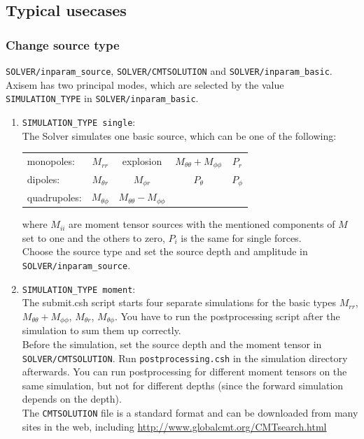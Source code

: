 \documentclass[11pt,letter,fleqn,english,notitlepage]{article}
\begin{document}
\subsection{Typical usecases}
\subsubsection{Change source type}
\verb|SOLVER/inparam_source|, \verb|SOLVER/CMTSOLUTION| and \verb|SOLVER/inparam_basic|.
Axisem has two principal modes, which are selected by the value \verb|SIMULATION_TYPE| in \verb|SOLVER/inparam_basic|.
\begin{enumerate}
 \item \verb|SIMULATION_TYPE single|:\\ The Solver simulates one basic source, which can be one of the following:\\
\begin{center}
\begin{tabular}{|l|cccc|} \hline
 monopoles:   & $M_{rr}$ & explosion  & $M_{\theta\theta}+M_{\phi\phi}$  & $P_r$ \\
 dipoles:     & $M_{\theta r}$ & $M_{\phi r}$        & $P_{\theta}$ & $P_{\phi}$\\
 quadrupoles: & $M_{\theta \phi}$ & $M_{\theta\theta}-M_{\phi\phi}$ & & \\\hline
\end{tabular}
\end{center}
where $M_{ii}$ are moment tensor sources with the mentioned components of $M$ set to one and the others to zero, $P_i$ is the same for single forces.\\
Choose the source type and set the source depth and amplitude in \verb|SOLVER/inparam_source|.
 \item \verb|SIMULATION_TYPE moment|:\\
 The submit.csh script starts four separate simulations for the basic types $M_{rr}$, $M_{\theta\theta}+M_{\phi\phi}$, $M_{\theta r}$, $M_{\theta \phi}$. You have to run the postprocessing script after the simulation to sum them up correctly. \\
 Before the simulation, set the source depth and the moment tensor in \verb|SOLVER/CMTSOLUTION|. Run \verb|postprocessing.csh| in the simulation directory afterwards. You can run postprocessing for different moment tensors on the same simulation, but not for different depths (since the forward simulation depends on the depth).\\
 The \verb|CMTSOLUTION| file is a standard format and can be downloaded from many sites in the web, including \url{http://www.globalcmt.org/CMTsearch.html}
\end{enumerate}
\end{document}
